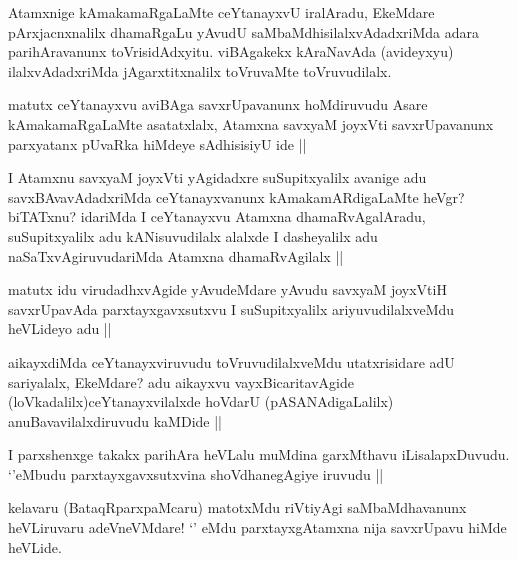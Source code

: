 Atamxnige kAmakamaRgaLaMte ceYtanayxvU iralAradu, EkeMdare pArxjacnxnalilx dhamaRgaLu yAvudU saMbaMdhisilalxvAdadxriMda adara parihAravanunx toVrisidAdxyitu. viBAgakekx kAraNavAda (avideyxyu) ilalxvAdadxriMda jAgarxtitxnalilx toVruvaMte toVruvudilalx.

\begin{artha}
matutx ceYtanayxvu aviBAga savxrUpavanunx hoMdiruvudu Asare kAmakamaRgaLaMte asatatxlalx, Atamxna savxyaM joyxVti savxrUpavanunx parxyatanx pUvaRka hiMdeye sAdhisisiyU ide ||
\end{artha}


\begin{artha}
I Atamxnu savxyaM joyxVti yAgidadxre suSupitxyalilx avanige adu savxBAvavAdadxriMda ceYtanayxvanunx kAmakamARdigaLaMte heVgr? biTATxnu? idariMda I ceYtanayxvu Atamxna dhamaRvAgalAradu, suSupitxyalilx adu kANisuvudilalx alalxde I dasheyalilx adu naSaTxvAgiruvudariMda Atamxna dhamaRvAgilalx ||
\end{artha}

\begin{artha}
matutx idu virudadhxvAgide yAvudeMdare yAvudu savxyaM joyxVtiH savxrUpavAda parxtayxgavxsutxvu I suSupitxyalilx ariyuvudilalxveMdu heVLideyo adu ||
\end{artha}


\begin{artha}
aikayxdiMda ceYtanayxviruvudu toVruvudilalxveMdu utatxrisidare adU sariyalalx, EkeMdare? adu aikayxvu vayxBicaritavAgide (loVkadalilx)ceYtanayxvilalxde hoVdarU (pASANAdigaLalilx) anuBavavilalxdiruvudu kaMDide ||
\end{artha}



\begin{artha}
I parxshenxge takakx parihAra heVLalu muMdina garxMthavu iLisalapxDuvudu. `\stext'eMbudu parxtayxgavxsutxvina shoVdhanegAgiye iruvudu ||
\end{artha}


\begin{artha}
kelavaru (BataqRparxpaMcaru) matotxMdu riVtiyAgi saMbaMdhavanunx heVLiruvaru adeVneVMdare! `\stext' eMdu parxtayxgAtamxna nija savxrUpavu hiMde heVLide.
\end{artha}

